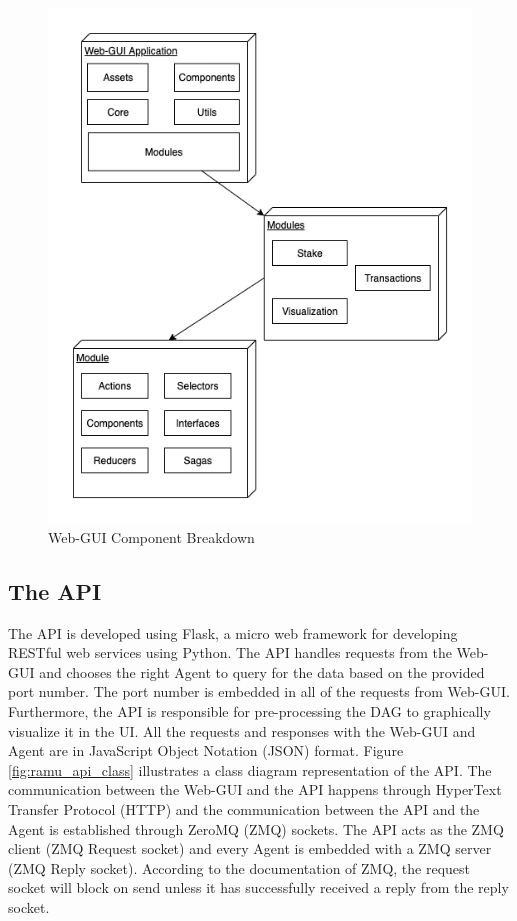 \begin{figure}[htbp]
    \centering
    \includegraphics[width=0.5\linewidth]{figures/images/ramu/gui_block.png}
	\caption{Web-GUI Component Breakdown}
	\label{fig:ramu_gui_blocks}
\end{figure}

\subsection{The API}
The API is developed using Flask, a micro web framework for developing RESTful web services using Python. The API handles requests from the Web-GUI and chooses the right Agent to query for the data based on the provided port number. The port number is embedded in all of the requests from Web-GUI. Furthermore, the API is responsible for pre-processing the DAG to graphically visualize it in the UI. All the requests and responses with the Web-GUI and Agent are in JavaScript Object Notation (JSON) format. Figure \ref{fig:ramu_api_class} illustrates a class diagram representation of the API. The communication between the Web-GUI and the API happens through HyperText Transfer Protocol (HTTP) and the communication between the API and the Agent is established through ZeroMQ (ZMQ) sockets. The API acts as the ZMQ client (ZMQ Request socket) and every Agent is embedded with a ZMQ server (ZMQ Reply socket). According to the documentation of ZMQ, the request socket will block on send unless it has successfully received a reply from the reply socket.

